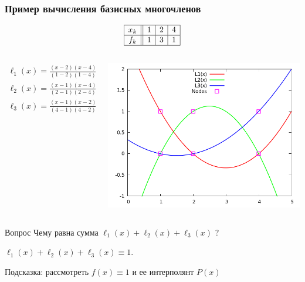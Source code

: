 \documentclass[aspectratio=169,unicode]{beamer}
\begin{document}
\begin{frame}
\frametitle{Пример вычисления базисных многочленов}
	\vspace{-2ex}
	\[
	\begin{array}{|c||c|c|c|}
	\hline
	x_k&1&2&4\\	\hline
	f_k&1&3&1\\	\hline
	\end{array}
	\]
	\begin{columns}[T]
		\begin{column}{0.55\textwidth}
		\vspace{-0.5cm}
		\begin{align*}
		\ell_1(x) = \frac{(x-2)(x-4)}{(1-2)(1-4)} = \frac{1}{3}(x-2)(x-4)\\
		\ell_2(x) = \frac{(x-1)(x-4)}{(2-1)(2-4)} = \frac{1}{2}(x-1)(4-x)\\
		\ell_3(x) = \frac{(x-1)(x-2)}{(4-1)(4-2)} = \frac{1}{6}(x-1)(x-2)
		\end{align*}
		\end{column}
		\begin{column}{0.45\textwidth}
		\centering
		\includegraphics[height=.37\textheight]{l.png}
		\end{column}
	\end{columns}
	\pause

	\begin{block}{Вопрос}
		Чему равна сумма $\ell_1(x) + \ell_2(x) + \ell_3(x)$ ?
		\pause

		$\ell_1(x) + \ell_2(x) + \ell_3(x) \equiv 1$.

		Подсказка: рассмотреть $f(x) \equiv 1$ и ее интерполянт $P(x)$
	\end{block}
\end{frame}
\end{document}
